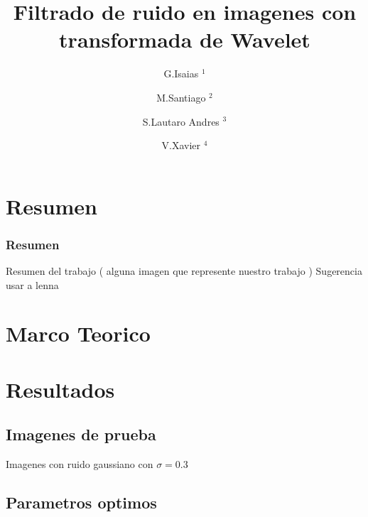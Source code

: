 \documentclass{beamer}
\title{Filtrado de ruido en imagenes con transformada de Wavelet}
\author{
  G.Isaias $^1$ \and   
  M.Santiago $^2$ \and 
  S.Lautaro Andres $^3$ \and
  V.Xavier $^4$ 
}
\institute{
  $^{1-2-3-4}$ Universidad Nacional del Comahue \\ 
  Buenos Aires , Neuquen \\ 
}
\date{}
\begin{document}
    
  \begin{frame}
    \titlepage  
  \end{frame}

  \begin{frame}
    \tableofcontents
  
    
  
  \end{frame}

  \section{Resumen}

  \begin{frame}
    \frametitle{Resumen}
    
    Resumen del trabajo ( alguna imagen que represente nuestro trabajo )
    Sugerencia usar a lenna
  
  \end{frame}

  \section{Marco Teorico}

  \section{Resultados}

  \subsection{Imagenes de prueba}

  \begin{frame}
  
    Imagenes con ruido gaussiano con $\sigma=0.3$
  \end{frame}

  \subsection{Parametros optimos}
\end{document}

